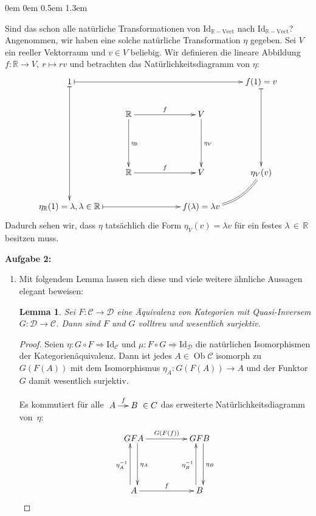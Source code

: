 \documentclass[a4paper,ngerman]{scrartcl}
\theoremstyle{definition}
\theoremstyle{plain}
\newtheorem{lemma}[defn]{Lemma}
\theoremstyle{remark}
\newcommand{\R}{\mathbb{R}}
\newcommand{\C}{\mathcal{C}}
\newcommand{\Vect}{\mathrm{Vect}}
\newcommand{\Id}{\mathrm{Id}}
\DeclareMathOperator{\Ob}{Ob}
\newcommand{\D}{\mathcal{D}}
\begin{document}
\begin{list}{}{0em \leftmargin0em \itemindent0.5em \itemsep 1.3em}
\begin{enumerate}
Sind das schon alle natürliche Transformationen von $\Id_{\R{-}\Vect}$ nach $\Id_{\R{-}\Vect}$? Angenommen, wir haben eine solche natürliche Transformation $\eta$ gegeben. Sei $V$ ein reeller Vektorraum und $v \in V$ beliebig. Wir definieren die lineare Abbildung $f : \R \to V,\ r \mapsto rv$ und betrachten das Natürlichkeitsdiagramm von $\eta$:
\[ \xymatrixcolsep{2pc}\xymatrix{
  1  \ar@{|->}[dddd] \ar@{|->}[rrrr] &&&& f(1) = v \ar@{|->}[ddd] \\
  & \R \ar[dd]^{\eta_{\R}} \ar[rr]^{f} && V \ar[dd]^{\eta_{V}} \\
  \\
  & \R \ar[rr]^{f} && V & \eta_{V}(v) \ar@{=}@/^1pc/[dl] \\
  \eta_{\R}(1) = \lambda, \lambda \in \R \ar@{|->}[rrr] &&& f(\lambda) = \lambda v
} \]
Dadurch sehen wir, dass $\eta$ tatsächlich die Form $\eta_{V}(v) = \lambda v$
für ein festes $\lambda\,\in\,\R$ besitzen muss.
\end{enumerate}

\item[\textbf{Aufgabe 2:}]\mbox{}

\begin{enumerate}
\item

Mit folgendem Lemma lassen sich diese und viele weitere ähnliche Aussagen elegant beweisen:

\begin{lemma}\label{equivVolltreuWesSurj} Sei $F : \C \to \D$ eine Äquivalenz von
Kategorien mit Quasi-Inversem $G : \D \to \C$. Dann sind $F$ und $G$ volltreu und
wesentlich surjektiv.
\end{lemma}

\begin{proof}
Seien $\eta:G \circ F \Rightarrow \Id_{\C}$ und $\mu:F \circ G \Rightarrow \Id_{\D}$ die natürlichen Isomorphismen der Kategorienäquivalenz. Dann ist jedes $A \in \Ob \C$ isomorph zu $G(F(A))$ mit dem Isomorphismus $\eta_{A}:G(F(A)) \to A$ und der Funktor $G$ damit wesentlich surjektiv.

Es kommutiert für alle $\xymatrixcolsep{1pc}\xymatrix{ A \ar[r]^{f} & B} \in C$ das erweiterte Natürlichkeitsdiagramm von~$\eta$:
\[ \xymatrixcolsep{4pc}\xymatrixrowsep{4pc}\xymatrix{
GFA \ar@<1ex>[d]^{\eta_{A}} \ar[r]^{G(F(f))} & GFB \ar@<1ex>[d]^{\eta_{B}} \\
A \ar@<1ex>[u]^{\eta_{A}^{-1}} \ar[r]^{f} & B \ar@<1ex>[u]^{\eta_{B}^{-1}}
} \]


\end{proof}
\end{enumerate}
\end{list}
\end{document}
